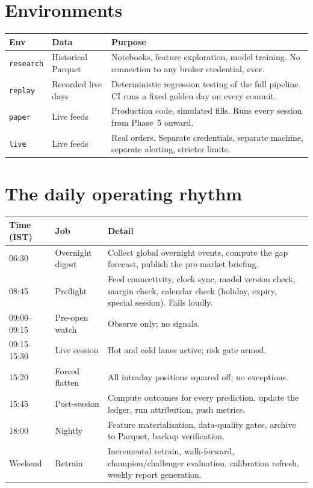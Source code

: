 \section{Environments}

\begin{longtable}{@{}p{2.8cm}p{3.6cm}p{8.2cm}@{}}
\toprule
\textbf{Env} & \textbf{Data} & \textbf{Purpose}\\
\midrule
\texttt{research} & Historical Parquet & Notebooks, feature exploration, model
training. No connection to any broker credential, ever.\\
\texttt{replay} & Recorded live days & Deterministic regression testing of the
full pipeline. CI runs a fixed golden day on every commit.\\
\texttt{paper} & Live feeds & Production code, simulated fills. Runs every
session from Phase~5 onward.\\
\texttt{live} & Live feeds & Real orders. Separate credentials, separate
machine, separate alerting, stricter limits.\\
\bottomrule
\end{longtable}

\section{The daily operating rhythm}

\begin{longtable}{@{}p{2.4cm}p{4.0cm}p{8.2cm}@{}}
\toprule
\textbf{Time (IST)} & \textbf{Job} & \textbf{Detail}\\
\midrule
06:30 & Overnight digest & Collect global overnight events, compute the gap
forecast, publish the pre-market briefing.\\
08:45 & Preflight & Feed connectivity, clock sync, model version check, margin
check, calendar check (holiday, expiry, special session). Fails loudly.\\
09:00--09:15 & Pre-open watch & Observe only; no signals.\\
09:15--15:30 & Live session & Hot and cold lanes active; risk gate armed.\\
15:20 & Forced flatten & All intraday positions squared off; no exceptions.\\
15:45 & Post-session & Compute outcomes for every prediction, update the ledger,
run attribution, push metrics.\\
18:00 & Nightly & Feature materialisation, data-quality gates, archive to
Parquet, backup verification.\\
Weekend & Retrain & Incremental retrain, walk-forward, champion/challenger
evaluation, calibration refresh, weekly report generation.\\
\bottomrule
\end{longtable}

